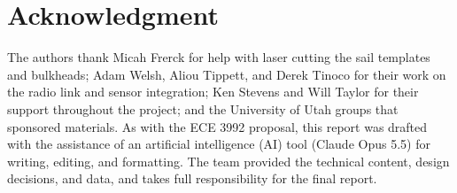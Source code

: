 \section*{Acknowledgment}
The authors thank Micah Frerck for help with laser cutting the sail
templates and bulkheads; Adam Welsh, Aliou Tippett, and Derek Tinoco for
their work on the radio link and sensor integration; Ken Stevens and Will Taylor for their support throughout the project; and the University of Utah groups that sponsored
materials. As with the ECE 3992 proposal, this report was drafted with the
assistance of an artificial intelligence (AI) tool (Claude Opus 5.5) for writing, editing, and
formatting. The team provided the technical content, design decisions, and
data, and takes full responsibility for the final report.
